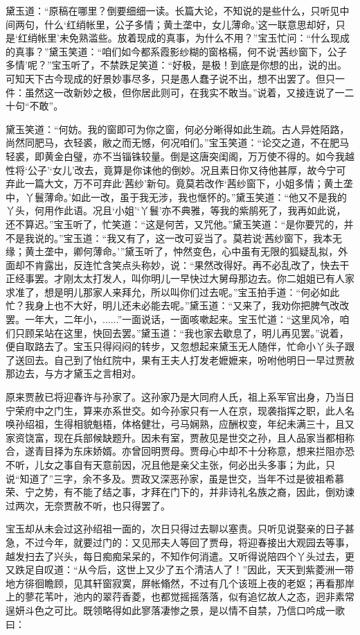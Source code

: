 \documentclass[12pt,oneside]{book}
\begin{document}
黛玉道：“原稿在哪里？倒要细细一读。长篇大论，不知说的是些什么，只听见中间两句，什么‘红绡帐里，公子多情；黄土垄中，女儿薄命。’这一联意思却好，只是‘红绡帐里’未免熟滥些。放着现成的真事，为什么不用？”宝玉忙问：“什么现成的真事？”黛玉笑道：“咱们如今都系霞影纱糊的窗格槅，何不说‘茜纱窗下，公子多情’呢？”宝玉听了，不禁跌足笑道：“好极，是极！到底是你想的出，说的出。可知天下古今现成的好景妙事尽多，只是愚人蠢子说不出，想不出罢了。但只一件：虽然这一改新妙之极，但你居此则可，在我实不敢当。”说着，又接连说了一二十句“不敢”。

黛玉笑道：“何妨。我的窗即可为你之窗，何必分晰得如此生疏。古人异姓陌路，尚然同肥马，衣轻裘，敝之而无憾，何况咱们。”宝玉笑道：“论交之道，不在肥马轻裘，即黄金白璧，亦不当锱铢较量。倒是这唐突闺阁，万万使不得的。如今我越性将‘公子’‘女儿’改去，竟算是你诔他的倒妙。况且素日你又待他甚厚，故今宁可弃此一篇大文，万不可弃此‘茜纱’新句。竟莫若改作‘茜纱窗下，小姐多情；黄土垄中，丫鬟薄命。’如此一改，虽于我无涉，我也惬怀的。”黛玉笑道：“他又不是我的丫头，何用作此语。况且‘小姐’‘丫鬟’亦不典雅，等我的紫鹃死了，我再如此说，还不算迟。”宝玉听了，忙笑道：“这是何苦，又咒他。”黛玉笑道：“是你要咒的，并不是我说的。”宝玉道：“我又有了，这一改可妥当了。莫若说‘茜纱窗下，我本无缘；黄土垄中，卿何薄命。’”黛玉听了，忡然变色，心中虽有无限的狐疑乱拟，外面却不肯露出，反连忙含笑点头称妙，说：“果然改得好。再不必乱改了，快去干正经事罢。才刚太太打发人，叫你明儿一早快过大舅母那边去。你二姐姐已有人家求准了，想是明儿那家人来拜允，所以叫你们过去呢。”宝玉拍手道：“何必如此忙？我身上也不大好，明儿还未必能去呢。”黛玉道：“又来了，我劝你把脾气改改罢。一年大，二年小，......”一面说话，一面咳嗽起来。宝玉忙道：“这里风冷，咱们只顾呆站在这里，快回去罢。”黛玉道：“我也家去歇息了，明儿再见罢。”说着，便自取路去了。宝玉只得闷闷的转步，又忽想起来黛玉无人随伴，忙命小丫头子跟了送回去。自己到了怡红院中，果有王夫人打发老嬷嬷来，吩咐他明日一早过贾赦那边去，与方才黛玉之言相对。

原来贾赦已将迎春许与孙家了。这孙家乃是大同府人氏，祖上系军官出身，乃当日宁荣府中之门生，算来亦系世交。如今孙家只有一人在京，现袭指挥之职，此人名唤孙绍祖，生得相貌魁梧，体格健壮，弓马娴熟，应酬权变，年纪未满三十，且又家资饶富，现在兵部候缺题升。因未有室，贾赦见是世交之孙，且人品家当都相称合，遂青目择为东床娇婿。亦曾回明贾母。贾母心中却不十分称意，想来拦阻亦恐不听，儿女之事自有天意前因，况且他是亲父主张，何必出头多事；为此，只说“知道了”三字，余不多及。贾政又深恶孙家，虽是世交，当年不过是彼祖希慕荣、宁之势，有不能了结之事，才拜在门下的，并非诗礼名族之裔，因此，倒劝谏过两次，无奈贾赦不听，也只得罢了。

宝玉却从未会过这孙绍祖一面的，次日只得过去聊以塞责。只听见说娶亲的日子甚急，不过今年，就要过门的：又见邢夫人等回了贾母，将迎春接出大观园去等事，越发扫去了兴头，每日痴痴呆呆的，不知作何消遣。又听得说陪四个丫头过去，更又跌足自叹道：“从今后，这世上又少了五个清洁人了！”因此，天天到紫菱洲一带地方徘徊瞻顾，见其轩窗寂寞，屏帐翛然，不过有几个该班上夜的老妪；再看那岸上的蓼花苇叶，池内的翠荇香菱，也都觉摇摇落落，似有追忆故人之态，迥非素常逞妍斗色之可比。既领略得如此寥落凄惨之景，是以情不自禁，乃信口吟成一歌曰：
\end{document}
